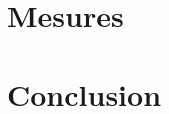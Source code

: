 \documentclass[
    mi, %
,table]{heig-tb}
\begin{document}
\chapter{Mesures}


\chapter{Conclusion}





\clearpage
%

\printbibliography

\appendix


\addappheadtotoc



\let\cleardoublepage\clearpage
\backmatter

\label{glossaire}
\printnoidxglossary
\label{index}
\printindex


\end{document}

